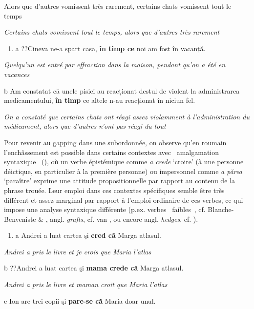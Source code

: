     Alors que d'autres vomissent très rarement, certains chats vomissent tout le temps

{\itshape
Certains chats vomissent tout le temps, alors que d'autres très rarement} 


\begin{enumerate}
\item \label{bkm:Ref299645771}a  ??Cineva ne-a spart casa, \textbf{în timp ce} noi am fost în vacanță.


\end{enumerate}
{\itshape
Quelqu'un est entré par effraction dans la maison, pendant qu'on a été en vacances}

  b  Am constatat că unele pisici au reacționat destul de violent la administrarea medicamentului, \textbf{în timp} ce altele n-au reacționat în niciun fel.

    \textit{On a constaté que certains chats ont réagi assez violamment à l'administration du médicament, alors que d'autres n'ont pas réagi du tout}

Pour revenir au gapping dans une subordonnée, on observe qu'en roumain l'enchâssement est possible dans certains contextes avec {\guillemotleft}~amalgamation syntaxique~{\guillemotright} (\citet{Lakoff1974}), où un verbe épistémique comme \textit{a crede} `croire' (à une personne déictique, en particulier à la première personne) ou impersonnel comme \textit{a părea} `paraître' exprime une attitude propositionnelle par rapport au contenu de la phrase trouée. Leur emploi dans ces contextes spécifiques semble être très différent et assez marginal par rapport à l'emploi ordinaire de ces verbes, ce qui impose une analyse syntaxique différente (p.ex. verbes {\guillemotleft}~faibles~{\guillemotright}, cf. Blanche-Benveniste \& \citet{Willems2007}, angl. \textit{grafts}, cf. van \citet{Riemsdijk2006}, ou encore angl. \textit{hedges}, cf. \citet{Lakoff1973}).


\begin{enumerate}
\item a  Andrei a luat cartea şi \textbf{cred că} Marga atlasul.


\end{enumerate}
{\itshape
Andrei a pris le livre et je crois que Maria l'atlas  } 

  b  ??Andrei a luat cartea şi \textbf{mama crede că} Marga atlasul.

{\itshape
Andrei a pris le livre et maman croit que Maria l'atlas  } 

  c  Ion are trei copii şi \textbf{pare-se că} Maria doar unul.

